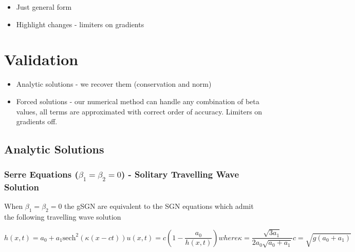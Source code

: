 \documentclass[10pt]{elsarticle}
\begin{document}
\begin{itemize}
	\item Just general form
	\item Highlight changes - limiters on gradients
\end{itemize}

\section{Validation}
\begin{itemize}
	\item Analytic solutions - we recover them (conservation and norm)
	\item Forced solutions - our numerical method can handle any combination of beta values, all terms are approximated with correct order of accuracy. Limiters on gradients off. 
\end{itemize}

\subsection{Analytic Solutions}
\subsubsection{Serre Equations ($\beta_1=\beta_2 =0$) - Solitary Travelling Wave Solution}
When $\beta_1 = \beta_2 = 0$ the gSGN are equivalent to the SGN equations which admit the following travelling wave solution



\begin{subequations}
	\begin{equation}
	h(x,t) = a_0 + a_1 \text{sech}^2\left( \kappa (x - ct) \right)
	\end{equation}
	\begin{equation}
	u(x,t) = c \left( 1- \dfrac{a_0}{h(x,t)} \right)
	\end{equation}
	where
	\begin{equation}
	\kappa = \dfrac{\sqrt{3a_1}}{2a_0 \sqrt{a_0 + a_1}}
	\end{equation}
	\begin{equation}
	c = \sqrt{g\left(a_0 + a_1\right)}
	\end{equation}
\end{subequations}
\end{document}
